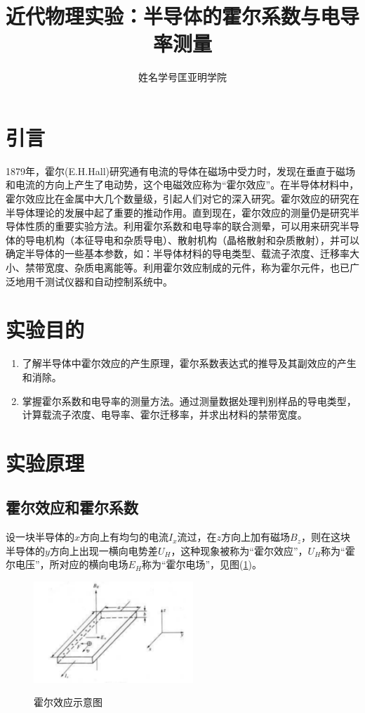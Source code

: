 \documentclass[a4paper]{article}
\title{近代物理实验：半导体的霍尔系数与电导率测量}
\author{ 姓名\quad 学号\quad 匡亚明学院}
\date{}
\begin{document}
	\maketitle
	
	
\section{引言}
1879年，霍尔(E.H.Hall)研究通有电流的导体在磁场中受力时，发现在垂直于磁场和电流的方向上产生了电动势，这个电磁效应称为“霍尔效应”。在半导体材料中，霍尔效应比在金属中大几个数量级，引起人们对它的深入研究。霍尔效应的研究在半导体理论的发展中起了重要的推动作用。直到现在，霍尔效应的测量仍是研究半导体性质的重要实验方法。利用霍尔系数和电导率的联合测晕，可以用来研究半导体的导电机构（本征导电和杂质导电）、散射机构（晶格散射和杂质散射），并可以确定半导体的一些基本参数，如：半导体材料的导电类型、载流子浓度、迁移率大小、禁带宽度、杂质电离能等。利用霍尔效应制成的元件，称为霍尔元件，也已广泛地用千测试仪器和自动控制系统中。

\section{实验目的}
\begin{enumerate}
	\item 了解半导体中霍尔效应的产生原理，霍尔系数表达式的推导及其副效应的产生和消除。
	\item 掌握霍尔系数和电导率的测量方法。通过测量数据处理判别样品的导电类型，计算载流子浓度、电导率、霍尔迁移率，并求出材料的禁带宽度。
\end{enumerate}

\section{实验原理}
\subsection{霍尔效应和霍尔系数}
设一块半导体的$x$方向上有均匀的电流$I_x$流过，在$z$方向上加有磁场$B_z$，则在这块半导体的$y$方向上出现一横向电势差$U_H$，这种现象被称为“霍尔效应”，$U_H$称为“霍尔电压”，所对应的横向电场$E_H$称为“霍尔电场”，见图(\ref{fig1})。
\begin{figure}[!h]
	\centering
	\includegraphics[width=6cm]{fig/fig1.png}\\
	\caption{霍尔效应示意图}\label{fig1}
\end{figure}
\end{document}
